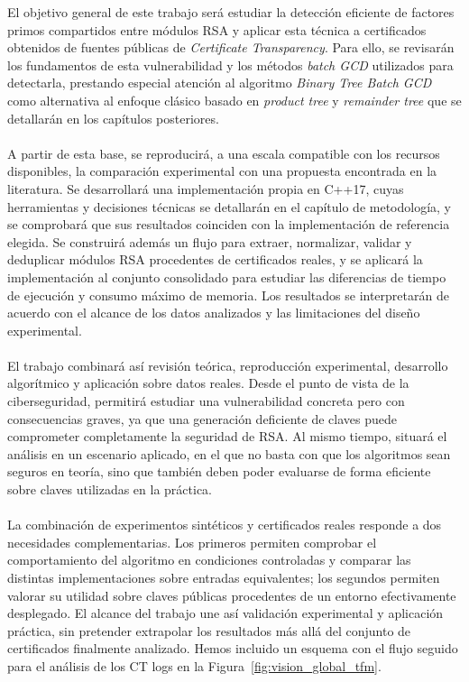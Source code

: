 El objetivo general de este trabajo será estudiar la detección eficiente de factores primos compartidos entre módulos RSA y aplicar esta técnica a certificados obtenidos de fuentes públicas de \textit{Certificate Transparency}. Para ello, se revisarán los fundamentos de esta vulnerabilidad y los métodos \textit{batch GCD} utilizados para detectarla, prestando especial atención al algoritmo \textit{Binary Tree Batch GCD} como alternativa al enfoque clásico basado en \textit{product tree} y \textit{remainder tree} que se detallarán en los capítulos posteriores.
\\
\\
A partir de esta base, se reproducirá, a una escala compatible con los recursos disponibles, la comparación experimental con una propuesta encontrada en la literatura. Se desarrollará una implementación propia en C++17, cuyas herramientas y decisiones técnicas se detallarán en el capítulo de metodología, y se comprobará que sus resultados coinciden con la implementación de referencia elegida. Se construirá además un flujo para extraer, normalizar, validar y deduplicar módulos RSA procedentes de certificados reales, y se aplicará la implementación al conjunto consolidado para estudiar las diferencias de tiempo de ejecución y consumo máximo de memoria. Los resultados se interpretarán de acuerdo con el alcance de los datos analizados y las limitaciones del diseño experimental.
\\
\\
El trabajo combinará así revisión teórica, reproducción experimental, desarrollo algorítmico y aplicación sobre datos reales. Desde el punto de vista de la ciberseguridad, permitirá estudiar una vulnerabilidad concreta pero con consecuencias graves, ya que una generación deficiente de claves puede comprometer completamente la seguridad de RSA. Al mismo tiempo, situará el análisis en un escenario aplicado, en el que no basta con que los algoritmos sean seguros en teoría, sino que también deben poder evaluarse de forma eficiente sobre claves utilizadas en la práctica.
\\
\\
La combinación de experimentos sintéticos y certificados reales responde a dos necesidades complementarias. Los primeros permiten comprobar el comportamiento del algoritmo en condiciones controladas y comparar las distintas implementaciones sobre entradas equivalentes; los segundos permiten valorar su utilidad sobre claves públicas procedentes de un entorno efectivamente desplegado. El alcance del trabajo une así validación experimental y aplicación práctica, sin pretender extrapolar los resultados más allá del conjunto de certificados finalmente analizado. Hemos incluido un esquema con el flujo seguido para el análisis de los CT logs en la Figura~\ref{fig:vision_global_tfm}.


